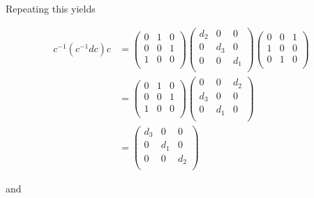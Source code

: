 \documentclass[../group-theory-in-a-nutshell-for-physicists.tex]{subfiles}
\begin{document}
\begin{questions}
\begin{solution}
Repeating this yields

\begin{align*}
c^{-1}(c^{- 1}dc)c &= \begin{pmatrix}
0 & 1 & 0 \\
0 & 0 & 1 \\
1 & 0 & 0 \\
\end{pmatrix}\begin{pmatrix}
d_{2} & 0 & 0 \\
0 & d_{3} & 0 \\
0 & 0 & d_{1} \\
\end{pmatrix}\begin{pmatrix}
0 & 0 & 1 \\
1 & 0 & 0 \\
0 & 1 & 0 \\
\end{pmatrix} \\
&= \begin{pmatrix}
0 & 1 & 0 \\
0 & 0 & 1 \\
1 & 0 & 0 \\
\end{pmatrix}\begin{pmatrix}
0 & 0 & d_{2} \\
d_{3} & 0 & 0 \\
0 & d_{1} & 0 \\
\end{pmatrix} \\
&= \begin{pmatrix}
d_{3} & 0 & 0 \\
0 & d_{1} & 0 \\
0 & 0 & d_{2} \\
\end{pmatrix}
\end{align*}

and


\end{solution}
\end{questions}
\end{document}
